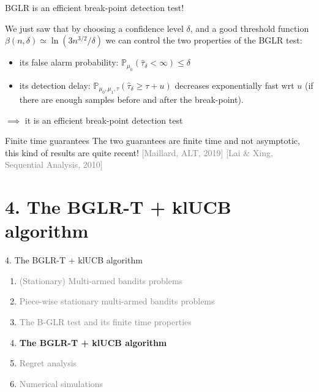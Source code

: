 \documentclass[11pt,english,ignorenonframetext,]{beamer}
\begin{document}
\begin{frame}{BGLR is an efficient break-point detection test!}

  We just saw that by choosing
  a confidence level $\delta$,
  and a good threshold function $\beta(n,\delta) \simeq \ln(3n^{3/2}/\delta)$
  we can control the two properties of the BGLR test:
  \begin{itemize}
    \item
      its false alarm probability:
      $\mathbb{P}_{\mu_0}(\widehat{\tau}_\delta < \infty) \leq \delta$
    \item
      its detection delay:
      $\mathbb{P}_{\mu_0,\mu_1,\tau} (\widehat{\tau}_{\delta} \geq \tau + u)$ decreases exponentially fast wrt $u$
    (if there are enough samples before and after the break-point).
  \end{itemize}

  $\implies$ it is an efficient break-point detection test

  \pause
  \begin{block}{Finite time guarantees}
    The two guarantees are \alert{finite time} and not asymptotic, this kind of results are quite recent!
    \hfill{}
    {\tiny
      \textcolor{gray}{[Maillard, ALT, 2019]}
      \textcolor{gray}{[Lai \& Xing, Sequential Analysis, 2010]}
    }
  \end{block}

\end{frame}

\section{\hfill{}4. The BGLR-T + klUCB algorithm\hfill{}}

\begin{frame}{4. The BGLR-T + klUCB algorithm}

  \begin{enumerate}
    \item
    \textcolor{gray}{
      (Stationary) Multi-armed bandits problems
    }
    \vspace*{15pt}

    \item
    \textcolor{gray}{
      Piece-wise stationary multi-armed bandits problems
    }
    \vspace*{15pt}

    \item
    \textcolor{gray}{
      The B-GLR test and its finite time properties
    }
    \vspace*{15pt}

    \item
    \alert{\textbf{%
      The BGLR-T + klUCB algorithm
    }}
    \vspace*{15pt}

    \item
    \textcolor{gray}{
      Regret analysis
    }
    \vspace*{15pt}

    \item
    \textcolor{gray}{
      Numerical simulations
    }
  \end{enumerate}

\end{frame}
\end{document}
